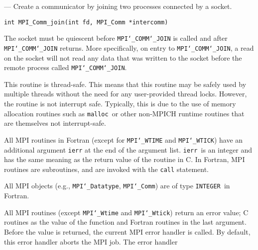 \startmanpage
{}
--- Create a communicator by joining two processes connected by  a socket. 
\startvb\begin{verbatim}
int MPI_Comm_join(int fd, MPI_Comm *intercomm)

\end{verbatim}
\endvb

\par
{}
\par
{}
The socket must be quiescent before {\tt MPI{\tt \char`\_}COMM{\tt \char`\_}JOIN} is called and after
{\tt MPI{\tt \char`\_}COMM{\tt \char`\_}JOIN} returns. More specifically, on entry to {\tt MPI{\tt \char`\_}COMM{\tt \char`\_}JOIN}, a
read on the socket will not read any data that was written to the socket
before the remote process called {\tt MPI{\tt \char`\_}COMM{\tt \char`\_}JOIN}.
\par
{}
\par
This routine is thread-safe.  This means that this routine may be
safely used by multiple threads without the need for any user-provided
thread locks.  However, the routine is not interrupt safe.  Typically,
this is due to the use of memory allocation routines such as {\tt malloc
}or other non-MPICH runtime routines that are themselves not interrupt-safe.
\par
{}
All MPI routines in Fortran (except for {\tt MPI{\tt \char`\_}WTIME} and {\tt MPI{\tt \char`\_}WTICK}) have
an additional argument {\tt ierr} at the end of the argument list.  {\tt ierr
}is an integer and has the same meaning as the return value of the routine
in C.  In Fortran, MPI routines are subroutines, and are invoked with the
{\tt call} statement.
\par
All MPI objects (e.g., {\tt MPI{\tt \char`\_}Datatype}, {\tt MPI{\tt \char`\_}Comm}) are of type {\tt INTEGER
}in Fortran.
\par
{}
\par
All MPI routines (except {\tt MPI{\tt \char`\_}Wtime} and {\tt MPI{\tt \char`\_}Wtick}) return an error value;
C routines as the value of the function and Fortran routines in the last
argument.  Before the value is returned, the current MPI error handler is
called.  By default, this error handler aborts the MPI job.  The error handler
